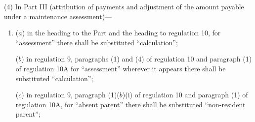 \documentclass[12pt,a4paper]{article}
\begin{document}
(4) In Part III (attribution of payments and adjustment of the amount payable under a maintenance assessment)—
\begin{enumerate}\item[]
($a$) in the heading to the Part and the heading to regulation 10, for “assessment” there shall be substituted “calculation”;

($b$) in regulation 9, paragraphs (1) and (4) of regulation 10 and paragraph (1) of regulation 10A for “assessment” wherever it appears there shall be substituted “calculation”;

($c$) in regulation 9, paragraph (1)($b$)(i)  of regulation 10 and paragraph (1) of regulation 10A, for “absent parent” there shall be substituted “non-resident parent”;

%
%
%
%
%
%


\end{enumerate}
\end{document}
